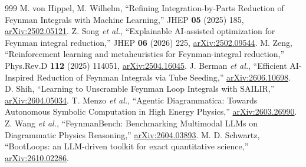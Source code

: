 \documentclass[a4paper,10pt]{ltjsarticle}
\begin{document}
\begin{thebibliography}{999}
 M. von Hippel, M. Wilhelm, ``Refining Integration-by-Parts Reduction of Feynman Integrals with Machine Learning,'' JHEP \textbf{05} (2025) 185, \href{https://arxiv.org/abs/2502.05121}{arXiv:2502.05121}.
 Z. Song \textit{et al.}, ``Explainable AI-assisted optimization for Feynman integral reduction,'' JHEP \textbf{06} (2026) 225, \href{https://arxiv.org/abs/2502.09544}{arXiv:2502.09544}.
 M. Zeng, ``Reinforcement learning and metaheuristics for Feynman-integral reduction,'' Phys.Rev.D \textbf{112} (2025) 114051, \href{https://arxiv.org/abs/2504.16045}{arXiv:2504.16045}.
 J. Berman \textit{et al.}, ``Efficient AI-Inspired Reduction of Feynman Integrals via Tube Seeding,'' \href{https://arxiv.org/abs/2606.10698}{arXiv:2606.10698}.
 D. Shih, ``Learning to Unscramble Feynman Loop Integrals with SAILIR,'' \href{https://arxiv.org/abs/2604.05034}{arXiv:2604.05034}.
 T. Menzo \textit{et al.}, ``Agentic Diagrammatica: Towards Autonomous Symbolic Computation in High Energy Physics,'' \href{https://arxiv.org/abs/2603.26990}{arXiv:2603.26990}.
 Z. Wang \textit{et al.}, ``FeynmanBench: Benchmarking Multimodal LLMs on Diagrammatic Physics Reasoning,'' \href{https://arxiv.org/abs/2604.03893}{arXiv:2604.03893}.
 M. D. Schwartz, ``BootLoops: an LLM-driven toolkit for exact quantitative science,'' \href{https://arxiv.org/abs/2610.02286}{arXiv:2610.02286}.
\end{thebibliography}
\end{document}
